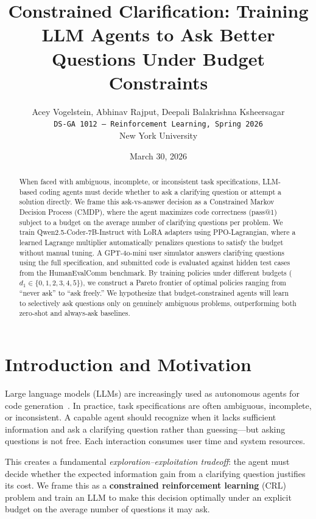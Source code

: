 \documentclass[11pt]{article}
\title{\textbf{Constrained Clarification: Training LLM Agents to Ask Better Questions Under Budget Constraints}}
\author{
  Acey Vogelstein, Abhinav Rajput, Deepali Balakrishna Ksheersagar \\
  \texttt{DS-GA 1012 --- Reinforcement Learning, Spring 2026} \\
  New York University
}
\date{March 30, 2026}
\begin{document}
\maketitle

\begin{abstract}
When faced with ambiguous, incomplete, or inconsistent task specifications, LLM-based coding agents must decide whether to ask a clarifying question or attempt a solution directly. We frame this ask-vs-answer decision as a Constrained Markov Decision Process (CMDP), where the agent maximizes code correctness (pass@1) subject to a budget on the average number of clarifying questions per problem. We train Qwen2.5-Coder-7B-Instruct with LoRA adapters using PPO-Lagrangian, where a learned Lagrange multiplier automatically penalizes questions to satisfy the budget without manual tuning. A GPT-4o-mini user simulator answers clarifying questions using the full specification, and submitted code is evaluated against hidden test cases from the HumanEvalComm benchmark. By training policies under different budgets ($d_1 \in \{0, 1, 2, 3, 4, 5\}$), we construct a Pareto frontier of optimal policies ranging from ``never ask'' to ``ask freely.'' We hypothesize that budget-constrained agents will learn to selectively ask questions only on genuinely ambiguous problems, outperforming both zero-shot and always-ask baselines.
\end{abstract}

\section{Introduction and Motivation}

Large language models (LLMs) are increasingly used as autonomous agents for code generation~\citep{chen2021codex, austin2021mbpp}. In practice, task specifications are often ambiguous, incomplete, or inconsistent. A capable agent should recognize when it lacks sufficient information and ask a clarifying question rather than guessing---but asking questions is not free. Each interaction consumes user time and system resources.

This creates a fundamental \emph{exploration--exploitation tradeoff}: the agent must decide whether the expected information gain from a clarifying question justifies its cost. We frame this as a \textbf{constrained reinforcement learning} (CRL) problem and train an LLM to make this decision optimally under an explicit budget on the average number of questions it may ask.
\end{document}
